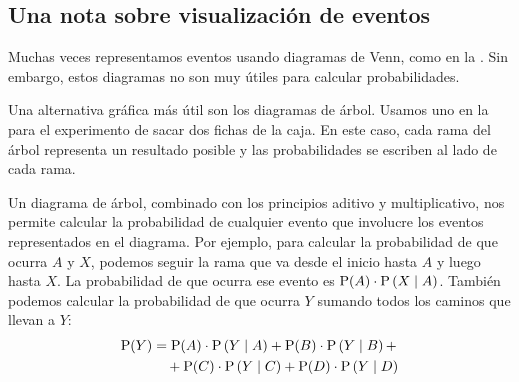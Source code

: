 \subsection{Una nota sobre visualización de eventos}

Muchas veces representamos eventos usando diagramas de Venn, como en la . Sin embargo, estos diagramas no son muy útiles para calcular probabilidades.

Una alternativa gráfica más útil son los diagramas de árbol. Usamos uno en la  para el experimento de sacar dos fichas de la caja. En este caso, cada rama del árbol representa un resultado posible y las probabilidades se escriben al lado de cada rama.

\begin{figure}[h]
\centering
{}
\end{figure}

Un diagrama de árbol, combinado con los principios aditivo y multiplicativo, nos permite calcular la probabilidad de cualquier evento que involucre los eventos representados en el diagrama. Por ejemplo, para calcular la probabilidad de que ocurra \(A\) y \(X\), podemos seguir la rama que va desde el inicio hasta \(A\) y luego hasta \(X\). La probabilidad de que ocurra ese evento es \(\operatorname{P}(A) \cdot \operatorname{P}\left(X\;\middle|\;A\right)\). También podemos calcular la probabilidad de que ocurra \(Y\) sumando todos los caminos que llevan a \(Y\): 
\begin{align*}
\operatorname{P}(Y) &= \operatorname{P}(A) \cdot \operatorname{P}\left(Y\;\middle|\;A\right) + \operatorname{P}(B) \cdot \operatorname{P}\left(Y\;\middle|\;B\right) +\\
&\quad + \operatorname{P}(C) \cdot \operatorname{P}\left(Y\;\middle|\;C\right) + \operatorname{P}(D) \cdot \operatorname{P}\left(Y\;\middle|\;D\right)
\end{align*}

